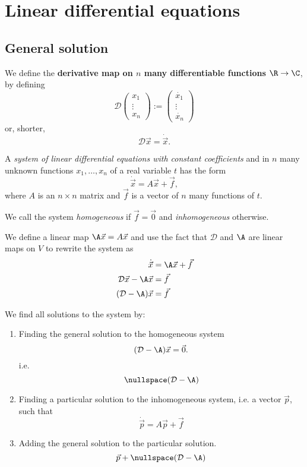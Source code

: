 \section{Linear differential equations}

\subsection{General solution}

\begin{definition}
    We define the \textbf{derivative map on $n$ many differentiable functions $\R \to \C$}, by defining
    $$\mathcal D \begin{pmatrix}x_1\\ \vdots \\ x_n\end{pmatrix} := \begin{pmatrix}\dot{x_1} \\ \vdots \\ \dot{x_n} \end{pmatrix}$$
    or, shorter,
    $$\mathcal D \vec{x} = \dot{\vec{x}}.$$
\end{definition}

\begin{definition}
    A \emph{system of linear differential equations with constant coefficients} and in $n$ many unknown functions $x_1, \dots, x_n$ of a real variable $t$
    has the form
    $$\dot{\vec{x}} = A \vec{x} + \vec{f},$$
    where $A$ is an $n \times n$ matrix and $\vec{f}$ is a vector of $n$ many functions of $t$.

    We call the system \emph{homogeneous} if $\vec{f} = \vec{0}$ and \emph{inhomogeneous} otherwise.
\end{definition}

We define a linear map $\A\vec{x} = A \vec{x}$ and use the fact that $\mathcal D$ and $\A$ are linear maps on $V$ to rewrite the system as
\begin{align*}
    \dot{\vec{x}} &= \A \vec{x} + \vec{f} \\
    \mathcal D \vec{x} - \A \vec{x} &= \vec{f} \\
    (\mathcal D - \A) \vec{x} &= \vec{f} \\
\end{align*}

\begin{remark}[Takeaway]
    We find all solutions to the system by:
    \begin{enumerate}
        \item Finding the general solution to the homogeneous system 
            $$(\mathcal D - \A) \vec{x} = \vec{0}.$$
            i.e.
            $$\nullspace(\mathcal D - \A)$$
        \item Finding a particular solution to the inhomogeneous system, i.e. a vector $\vec{p}$, such that
            $$\dot{\vec{p}} = A\vec{p} + \vec{f}$$
        \item Adding the general solution to the particular solution.
            $$\vec{p} + \nullspace(\mathcal D - \A)$$
    \end{enumerate}
\end{remark}

